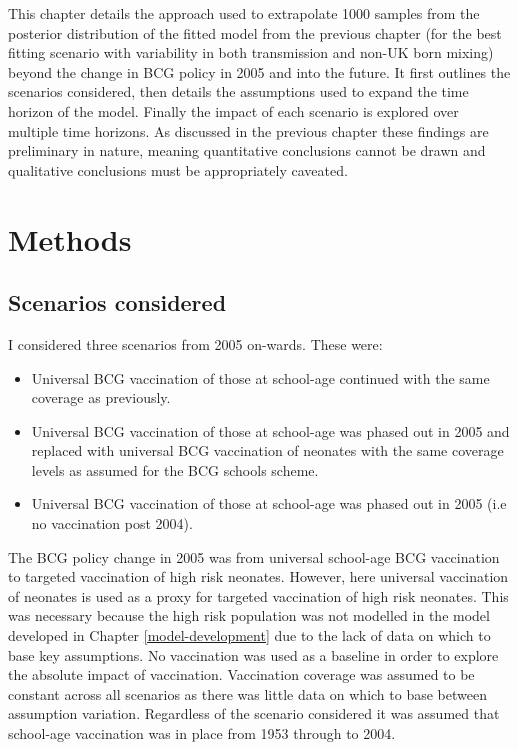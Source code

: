 \documentclass[11pt,twoside]{bristolthesis}
\providecommand{\tightlist}{%
  \setlength{\itemsep}{0pt}\setlength{\parskip}{0pt}}
\begin{document}
  This chapter details the approach used to extrapolate 1000 samples from the posterior distribution of the fitted model from the previous chapter (for the best fitting scenario with variability in both transmission and non-UK born mixing) beyond the change in BCG policy in 2005 and into the future. It first outlines the scenarios considered, then details the assumptions used to expand the time horizon of the model. Finally the impact of each scenario is explored over multiple time horizons. As discussed in the previous chapter these findings are preliminary in nature, meaning quantitative conclusions cannot be drawn and qualitative conclusions must be appropriately caveated.
  
  \hypertarget{methods-2}{%
  \section{Methods}\label{methods-2}}
  
  \hypertarget{scenarios-considered}{%
  \subsection{Scenarios considered}\label{scenarios-considered}}
  
  I considered three scenarios from 2005 on-wards. These were:
  \begin{itemize}
  \tightlist
  \item
    Universal BCG vaccination of those at school-age continued with the same coverage as previously.
  \item
    Universal BCG vaccination of those at school-age was phased out in 2005 and replaced with universal BCG vaccination of neonates with the same coverage levels as assumed for the BCG schools scheme.
  \item
    Universal BCG vaccination of those at school-age was phased out in 2005 (i.e no vaccination post 2004).
  \end{itemize}
  The BCG policy change in 2005 was from universal school-age BCG vaccination to targeted vaccination of high risk neonates. However, here universal vaccination of neonates is used as a proxy for targeted vaccination of high risk neonates. This was necessary because the high risk population was not modelled in the model developed in Chapter \ref{model-development} due to the lack of data on which to base key assumptions. No vaccination was used as a baseline in order to explore the absolute impact of vaccination. Vaccination coverage was assumed to be constant across all scenarios as there was little data on which to base between assumption variation. Regardless of the scenario considered it was assumed that school-age vaccination was in place from 1953 through to 2004.
  
\end{document}
